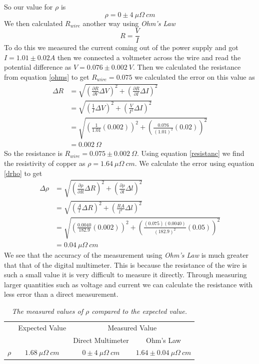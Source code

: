 \documentclass[11pt]{article}
\numberwithin{equation}{section}
\begin{document}
So our value for $\rho$ is
$$\rho = 0\pm4\ \mu\Omega\ cm$$
We then calculated $R_{wire}$ another way using \emph{Ohm's Law}
\begin{equation}
R = \frac{V}{I}
\label{ohms}
\end{equation}
To do this we measured the current coming out of the power supply and got $I = 1.01\pm0.02 A$ then we connected a voltmeter across the wire and read the potential difference as $V = 0.076\pm0.002\ V$. Then we calculated the resistance from equation \ref{ohms} to get $R_{wire} = 0.075$ we calculated the error on this value as
\begin{align*}
\Delta R &= \sqrt{\left(\frac{\partial R}{\partial V}\Delta V\right)^2+\left(\frac{\partial R}{\partial I}\Delta I\right)^2}\\
&= \sqrt{\left(\frac{1}{I}\Delta V\right)^2+\left(\frac{V}{I^2}\Delta I\right)^2}\\
&= \sqrt{\left(\frac{1}{1.01}(0.002)\right)^2+\left(\frac{0.076}{(1.01)^2}(0.02)\right)^2}\\
&= 0.002\ \Omega
\end{align*}
So the resistance is $R_{wire} = 0.075\pm0.002\ \Omega$. Using equation \ref{resistanc} we find the resistivity of copper as $\rho = 1.64\ \mu\Omega\ cm$. We calculate the error using equation \ref{drho} to get 
\begin{align*}
\Delta\rho &= \sqrt{\left(\frac{\partial \rho}{\partial R}\Delta R\right)^2 + \left(\frac{\partial \rho}{\partial l}\Delta l\right)^2}\\
&= \sqrt{\left(\frac{A}{l}\Delta R\right)^2 + \left(\frac{R A}{l^2}\Delta l\right)^2}\\
&= \sqrt{\left(\frac{0.0040}{182.9}(0.002)\right)^2 + \left(\frac{(0.075)(0.0040)}{(182.9)^2}(0.05)\right)^2}\\
&= 0.04\ \mu\Omega\ cm
\end{align*}
We see that the accuracy of the measurement using \emph{Ohm's Law} is much greater that that of the digital multimeter. This is because the resistance of the wire is such a small value it is very difficult to measure it directly. Through measuring larger quantities such as voltage and current we can calculate the resistance with less error than a direct measurement.
\begin{table}[ht]
\begin{center}
\begin{tabular}{cccc}
		&Expected Value			&\multicolumn{2}{c}{Measured Value}\\
		&						&Direct Multimeter		&Ohm's Law \\
\hline
$\rho$	&$1.68\ \mu\Omega\ cm$	&$0\pm4\ \mu\Omega\ cm$	&$1.64\pm0.04\ \mu\Omega\ cm$
\end{tabular}
\end{center}
\caption{\textit{The measured values of $\rho$ compared to the expected value.}}
\label{rhomeas}
\end{table}
\end{document}
